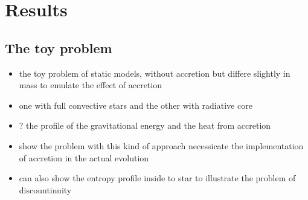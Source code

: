 \documentclass[12pt,a4paper]{article}
\newcommand{\mr}{\mathrm}
\newenvironment{outline}[1]{%
  \begin{itemize}[label=\textbullet]%
  \color{#1}%
}{%
  \end{itemize}%
}
\begin{document}





\section{Results}
\label{sec:results}

\subsection{The toy problem}
\label{sec:toy_problem}
\begin{outline}{gray}
  \item the toy problem of static models, without accretion but differe slightly in mass to emulate the effect of accretion
  \item one with full convective stars and the other with radiative core
  \item ? the profile of the gravitational energy and the heat from accretion
  \item show the problem with this kind of approach necessicate the implementation of accretion in the actual evolution 
  \item can also show the entropy profile inside to star to illustrate the problem of discountinuity
\end{outline}
\end{document}

